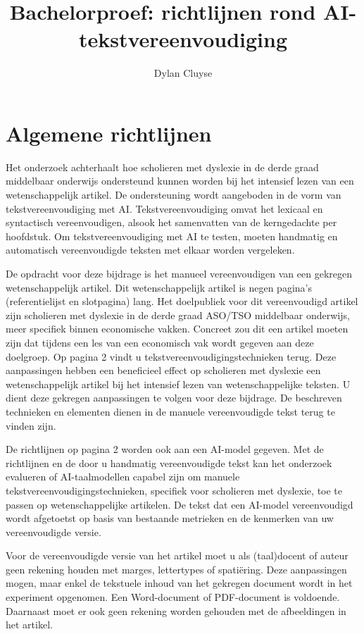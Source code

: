 \documentclass{report}
\title{Bachelorproef: richtlijnen rond AI-tekstvereenvoudiging}
\author{Dylan Cluyse}
\begin{document}
	\chapter{Algemene richtlijnen}
	
	Het onderzoek achterhaalt hoe scholieren met dyslexie in de derde graad middelbaar onderwijs ondersteund kunnen worden bij het intensief lezen van een wetenschappelijk artikel. De ondersteuning wordt aangeboden in de vorm van tekstvereenvoudiging met AI. Tekstvereenvoudiging omvat het lexicaal en syntactisch vereenvoudigen, alsook het samenvatten van de kerngedachte per hoofdstuk. Om tekstvereenvoudiging met AI te testen, moeten handmatig en automatisch vereenvoudigde teksten met elkaar worden vergeleken. 
	
	\medspace
	
	De opdracht voor deze bijdrage is het manueel vereenvoudigen van een gekregen wetenschappelijk artikel. Dit wetenschappelijk artikel is negen pagina's (referentielijst en slotpagina) lang. Het doelpubliek voor dit vereenvoudigd artikel zijn scholieren met dyslexie in de derde graad ASO/TSO middelbaar onderwijs, meer specifiek binnen economische vakken. Concreet zou dit een artikel moeten zijn dat tijdens een les van een economisch vak wordt gegeven aan deze doelgroep. Op pagina 2 vindt u tekstvereenvoudigingstechnieken terug. Deze aanpassingen hebben een beneficieel effect op scholieren met dyslexie een wetenschappelijk artikel bij het intensief lezen van wetenschappelijke teksten. U dient deze gekregen aanpassingen te volgen voor deze bijdrage. De beschreven technieken en elementen dienen in de manuele vereenvoudigde tekst terug te vinden zijn. 
	
	\medspace
	
	De richtlijnen op pagina 2 worden ook aan een AI-model gegeven. Met de richtlijnen en de door u handmatig vereenvoudigde tekst kan het onderzoek evalueren of AI-taalmodellen capabel zijn om manuele tekstvereenvoudigingstechnieken, specifiek voor scholieren met dyslexie, toe te passen op wetenschappelijke artikelen. De tekst dat een AI-model vereenvoudigd wordt afgetoetst op basis van bestaande metrieken en de kenmerken van uw vereenvoudigde versie. %
	
	\medspace
	
	Voor de vereenvoudigde versie van het artikel moet u als (taal)docent of auteur geen rekening houden met marges, lettertypes of spatiëring. Deze aanpassingen mogen, maar enkel de tekstuele inhoud van het gekregen document wordt in het experiment opgenomen. Een Word-document of PDF-document is voldoende. Daarnaast moet er ook geen rekening worden gehouden met de afbeeldingen in het artikel.
	
\end{document}
